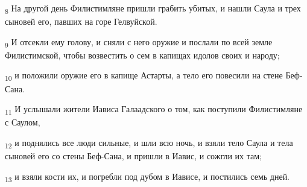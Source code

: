 \begin{tcolorbox}
\textsubscript{8} На другой день Филистимляне пришли грабить убитых, и нашли Саула и трех сыновей его, павших на горе Гелвуйской.
\end{tcolorbox}
\begin{tcolorbox}
\textsubscript{9} И отсекли ему голову, и сняли с него оружие и послали по всей земле Филистимской, чтобы возвестить о сем в капищах идолов своих и народу;
\end{tcolorbox}
\begin{tcolorbox}
\textsubscript{10} и положили оружие его в капище Астарты, а тело его повесили на стене Беф-Сана.
\end{tcolorbox}
\begin{tcolorbox}
\textsubscript{11} И услышали жители Иависа Галаадского о том, как поступили Филистимляне с Саулом,
\end{tcolorbox}
\begin{tcolorbox}
\textsubscript{12} и поднялись все люди сильные, и шли всю ночь, и взяли тело Саула и тела сыновей его со стены Беф-Сана, и пришли в Иавис, и сожгли их там;
\end{tcolorbox}
\begin{tcolorbox}
\textsubscript{13} и взяли кости их, и погребли под дубом в Иависе, и постились семь дней.
\end{tcolorbox}
